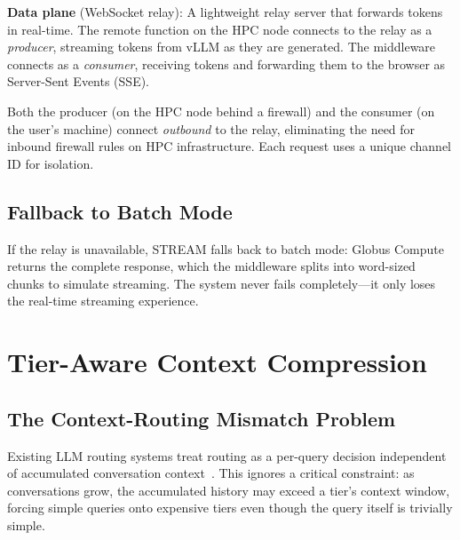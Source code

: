 \documentclass[manuscript, review]{acmart}
\begin{document}
\textbf{Data plane} (WebSocket relay): A lightweight relay server that forwards tokens in real-time. The remote function on the HPC node connects to the relay as a \textit{producer}, streaming tokens from vLLM as they are generated. The middleware connects as a \textit{consumer}, receiving tokens and forwarding them to the browser as Server-Sent Events (SSE).


Both the producer (on the HPC node behind a firewall) and the consumer (on the user's machine) connect \textit{outbound} to the relay, eliminating the need for inbound firewall rules on HPC infrastructure. Each request uses a unique channel ID for isolation.

\subsection{Fallback to Batch Mode}

If the relay is unavailable, STREAM falls back to batch mode: Globus Compute returns the complete response, which the middleware splits into word-sized chunks to simulate streaming. The system never fails completely---it only loses the real-time streaming experience.


\section{Tier-Aware Context Compression}
\label{sec:compression}

\subsection{The Context-Routing Mismatch Problem}

Existing LLM routing systems treat routing as a per-query decision independent of accumulated conversation context~\cite{routellm2024,hybridllm2024,frugalgpt2023}. This ignores a critical constraint: as conversations grow, the accumulated history may exceed a tier's context window, forcing simple queries onto expensive tiers even though the query itself is trivially simple.
\end{document}
